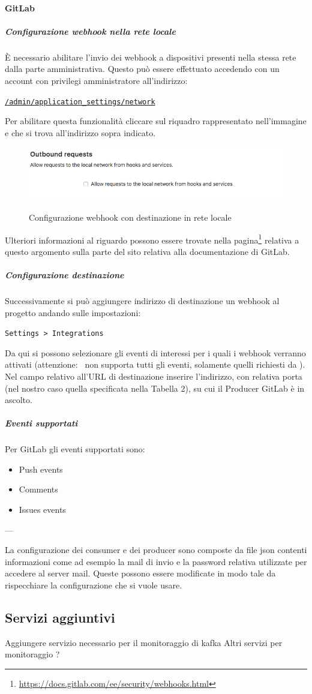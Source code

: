 	\paragraph{GitLab}
		\subparagraph{Configurazione webhook nella rete locale}
		È necessario abilitare l'invio dei webhook a dispositivi presenti nella stessa rete dalla parte amministrativa.
		Questo può essere effettuato accedendo con un account con privilegi amministratore all'indirizzo:
		\begin{center}
			\texttt{\url{/admin/application_settings/network}}
		\end{center}
		Per abilitare questa funzionalità cliccare sul riquadro rappresentato nell'immagine e che si trova all'indirizzo sopra indicato.
		\begin{figure}[H]
			\centering
			\includegraphics[width=13cm]{img/webhook_gitlab_setup.png}\\
			\caption[Webhook, GitLab]{Configurazione webhook con destinazione in rete locale}
		\end{figure}
		Ulteriori informazioni al riguardo possono essere trovate nella pagina\footnote{\url{https://docs.gitlab.com/ee/security/webhooks.html}} relativa a questo argomento sulla parte del sito relativa alla documentazione di GitLab.
		\subparagraph{Configurazione destinazione}
		Successivamente si può aggiungere indirizzo di destinazione un webhook al progetto andando sulle impostazioni:
		\begin{center}
			\texttt{Settings > Integrations}
		\end{center}
		Da qui si possono selezionare gli eventi di interessi per i quali i webhook verranno attivati (attenzione: \progetto~non supporta tutti gli eventi, solamente quelli richiesti da \II).
		Nel campo relativo all'URL di destinazione inserire l'indirizzo, con relativa porta (nel nostro caso quella specificata nella Tabella 2), su cui il Producer GitLab è in ascolto.
		\subparagraph{Eventi supportati}
		Per GitLab gli eventi supportati sono:
		\begin{itemize}
			\item Push events
			\item Comments
			\item Issues events
		\end{itemize}


---


	La configurazione dei consumer e dei producer sono composte da file json contenti informazioni come ad esempio la mail di invio e la password relativa utilizzate per accedere al server mail.
	Queste possono essere modificate in modo tale da rispecchiare la configurazione che si vuole usare.
	
\subsection{Servizi aggiuntivi}
Aggiungere servizio necessario per il monitoraggio di kafka
Altri servizi per monitoraggio ?